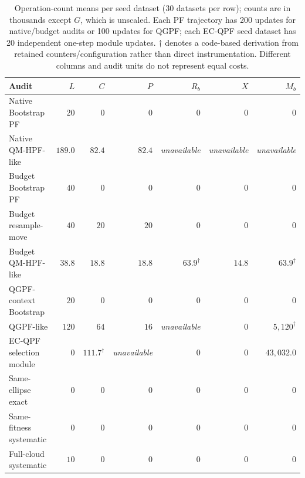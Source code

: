 \begin{table}[htbp]
\centering
\scriptsize
\setlength{\tabcolsep}{3pt}
\begin{tabular}{lrrrrrr}
\toprule
Audit & $L$ & $C$ & $P$ & $R_b$ & $X$ & $M_b$ \\
\midrule
Native Bootstrap PF & $20$ & $0$ & $0$ & $0$ & $0$ & $0$ \\
Native QM-HPF-like & $189.0$ & $82.4$ & $82.4$ & \textit{unavailable} & \textit{unavailable} & \textit{unavailable} \\
Budget Bootstrap PF & $40$ & $0$ & $0$ & $0$ & $0$ & $0$ \\
Budget resample-move & $40$ & $20$ & $20$ & $0$ & $0$ & $0$ \\
Budget QM-HPF-like & $38.8$ & $18.8$ & $18.8$ & $63.9^{\dagger}$ & $14.8$ & $63.9^{\dagger}$ \\
QGPF-context Bootstrap & $20$ & $0$ & $0$ & $0$ & $0$ & $0$ \\
QGPF-like & $120$ & $64$ & $16$ & \textit{unavailable} & $0$ & $5,120^{\dagger}$ \\
EC-QPF selection module & $0$ & $111.7^{\dagger}$ & \textit{unavailable} & $0$ & $0$ & $43,032.0$ \\
Same-ellipse exact & $0$ & $0$ & $0$ & $0$ & $0$ & $0$ \\
Same-fitness systematic & $0$ & $0$ & $0$ & $0$ & $0$ & $0$ \\
Full-cloud systematic & $10$ & $0$ & $0$ & $0$ & $0$ & $0$ \\
\bottomrule
\end{tabular}
\caption{Operation-count means per seed dataset (30 datasets per row); counts are in thousands except $G$, which is unscaled. Each PF trajectory has 200 updates for native/budget audits or 100 updates for QGPF; each EC-QPF seed dataset has 20 independent one-step module updates. $\dagger$ denotes a code-based derivation from retained counters/configuration rather than direct instrumentation. Different columns and audit units do not represent equal costs.}
\label{tab:audit-counts}
\end{table}
